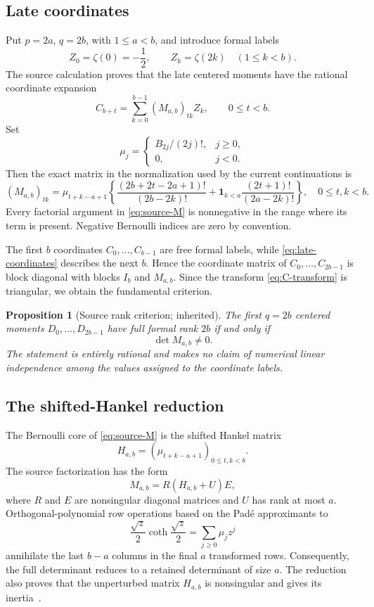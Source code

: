 \documentclass[11pt]{article}
\newtheorem{proposition}[theorem]{Proposition}
\theoremstyle{definition}
\begin{document}
\subsection{Late coordinates}

Put $p=2a$, $q=2b$, with $1\le a<b$, and introduce formal labels
\[
 Z_0=\zeta(0)=-\frac12,
 \qquad Z_k=\zeta(2k)\quad(1\le k<b).
\]
The source calculation proves that the late centered moments have the
rational coordinate expansion
\begin{equation}
 C_{b+t}=\sum_{k=0}^{b-1}(M_{a,b})_{tk}Z_k,
 \qquad 0\le t<b.
 \label{eq:late-coordinates}
\end{equation}
Set
\[
 \mu_j=
 \begin{cases}
 B_{2j}/(2j)!,&j\ge0,\\
 0,&j<0.
 \end{cases}
\]
Then the exact matrix in the normalization used by the current
continuations is
\begin{equation}
 (M_{a,b})_{tk}=\mu_{t+k-a+1}
 \left\{
 \frac{(2b+2t-2a+1)!}{(2b-2k)!}
 +\mathbf1_{k<a}\frac{(2t+1)!}{(2a-2k)!}
 \right\},
 \quad 0\le t,k<b.
 \label{eq:source-M}
\end{equation}
Every factorial argument in \eqref{eq:source-M} is nonnegative in the
range where its term is present.  Negative Bernoulli indices are zero
by convention.

The first $b$ coordinates $C_0,\ldots,C_{b-1}$ are free formal labels,
while \eqref{eq:late-coordinates} describes the next $b$.  Hence the
coordinate matrix of $C_0,\ldots,C_{2b-1}$ is block diagonal with
blocks $I_b$ and $M_{a,b}$.  Since the transform
\eqref{eq:C-transform} is triangular, we obtain the fundamental
criterion.

\begin{proposition}[Source rank criterion; inherited]
\label{prop:rank-criterion}
The first $q=2b$ centered moments $D_0,\ldots,D_{2b-1}$ have full
formal rank $2b$ if and only if
\[
 \det M_{a,b}\ne0.
\]
The statement is entirely rational and makes no claim of numerical
linear independence among the values assigned to the coordinate
labels.
\end{proposition}

\subsection{The shifted-Hankel reduction}

The Bernoulli core of \eqref{eq:source-M} is the shifted Hankel matrix
\begin{equation}
 H_{a,b}=(\mu_{t+k-a+1})_{0\le t,k<b}.
 \label{eq:H}
\end{equation}
The source factorization has the form
\[
 M_{a,b}=R(H_{a,b}+U)E,
\]
where $R$ and $E$ are nonsingular diagonal matrices and $U$ has rank at
most $a$.  Orthogonal-polynomial row operations based on the Pad\'e
approximants to
\[
 \frac{\sqrt z}{2}\coth\frac{\sqrt z}{2}
   =\sum_{j\ge0}\mu_jz^j
\]
annihilate the last $b-a$ columns in the final $a$ transformed rows.
Consequently, the full determinant reduces to a retained determinant of
size $a$.  The reduction also proves that the unperturbed matrix
$H_{a,b}$ is nonsingular and gives its inertia~\cite{BTD,QSR,DilcherJiu2022,DilcherJiu2023}.
\end{document}
